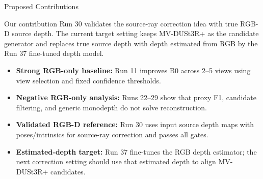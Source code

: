 \begin{frame}{Proposed Contributions}
  \begin{alertblock}{Our contribution}
    Run 30 validates the source-ray correction idea with true RGB-D source
    depth. The current target setting keeps MV-DUSt3R+ as the candidate
    generator and replaces true source depth with depth estimated from RGB by
    the Run 37 fine-tuned depth model.
  \end{alertblock}

  \vspace{0.12cm}
  \begin{itemize}
    \item \textbf{Strong RGB-only baseline:} Run 11 improves B0 across 2--5
    views using view selection and fixed confidence thresholds.
    \item \textbf{Negative RGB-only analysis:} Runs 22--29 show that proxy F1,
    candidate filtering, and generic monodepth do not solve reconstruction.
    \item \textbf{Validated RGB-D reference:} Run 30 uses input source depth
    maps with poses/intrinsics for source-ray correction and passes all gates.
    \item \textbf{Estimated-depth target:} Run 37 fine-tunes the RGB depth
    estimator; the next correction setting should use that estimated depth to
    align MV-DUSt3R+ candidates.
  \end{itemize}
\end{frame}

